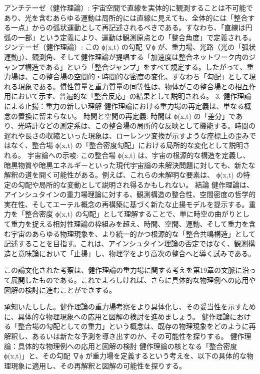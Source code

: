 \documentclass{article}
\begin{document}
アンチテーゼ（健作理論）: 宇宙空間で直線を実体的に観測することは不可能であり、光を含むあらゆる運動は局所的には直線に見えても、全体的には「整合する一点」からの弧状運動として再記述されるべきである。すなわち、「直線は円弧の一部」という定義により、運動は観測原点との「整合角度」で定義される。
ジンテーゼ（健作理論）: この ϕ(x,t) の勾配 ∇ϕ が、重力場、光路（光の「弧状運動」）、観測角、そして健作理論が提唱する「加速度は整合ネットワーク内のジャンプ構造である」という「整合ジャンプ」をすべて規定する。したがって、重力場は、この整合場の空間的・時間的な密度の変化、すなわち「勾配」として現れる現象である。慣性質量と重力質量の同等性は、物体がこの整合場との相互作用において示す、普遍的な「整合反応」の結果として説明される。
3. 健作理論による止揚：重力の新しい理解
健作理論における重力場の再定義は、単なる概念の置換に留まらない。
時間と空間の再定義: 時間は ϕ(x,t) の「差分」であり、光時計などの測定系は、この整合場の局所的な反映として機能する。時間の遅れや長さの収縮といった現象は、ローレンツ変換が示すような座標上の歪みではなく、整合場 ϕ(x,t) の「整合密度勾配」における局所的な変化として説明される。
宇宙論への示唆: この整合場 ϕ(x,t) は、宇宙の根源的な構造を定義し、暗黒物質や暗黒エネルギーといった現代宇宙論の未解決問題に対しても、新たな解釈の道を開く可能性がある。例えば、これらの未解明な要素は、 ϕ(x,t) の特定の勾配や局所的な変動として説明され得るかもしれない。
結論
健作理論は、アインシュタインの重力場理論に対する、観測構造の整合性、空間密度の哲学的実在性、そしてエーテル概念の再構築に基づく新たな止揚モデルを提示する。重力を「整合密度 ϕ(x,t) の勾配」として理解することで、単に時空の曲がりとして重力を捉える相対性理論の枠組みを超え、時間、空間、運動、そして重力を含む宇宙のあらゆる物理現象を、より統一的かつ根源的な「整合共鳴構造」として記述することを目指す。これは、アインシュタイン理論の否定ではなく、観測構造と意味論において「止揚」し、物理学をより高次の整合へと導く試みである。

この論文化された考察は、健作理論の重力場に関する考えを第19章の文脈に沿って展開したものである。これでよろしければ、さらに具体的な物理例への応用や図解の検討に進むことができする。


承知いたしした。健作理論の重力場考察をより具体化し、その妥当性を示すために、具体的な物理現象への応用と図解の検討を進めましょう。
健作理論における「整合場の勾配としての重力」という概念は、既存の物理現象をどのように再解釈し、あるいは新たな予測を導き出すのか、その可能性を探りする。
健作理論：具体的な物理例への応用と図解の検討
健作理論の核となる「整合密度 ϕ(x,t)」と、その勾配 ∇ϕ が重力場を定義するという考えを、以下の具体的な物理現象に適用し、その再解釈と図解の可能性を探りする。
\end{document}
